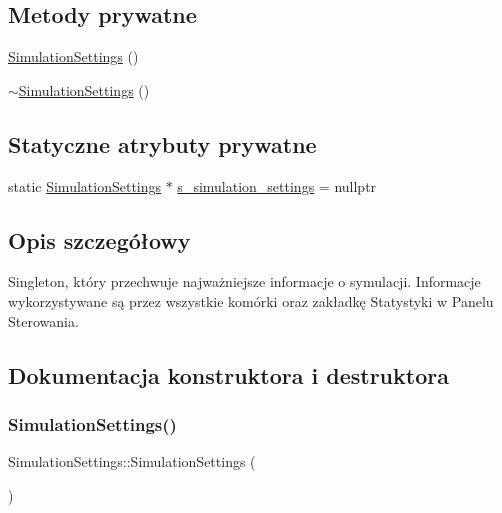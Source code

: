 \subsection*{Metody prywatne}
\begin{DoxyCompactItemize}
\item 
\mbox{\hyperlink{class_simulation_settings_a2fafe4514597b881fbec0caced94c0e5}{Simulation\+Settings}} ()
\item 
\mbox{\hyperlink{class_simulation_settings_a7f09bfc79639238aa08fee0f6f2d0548}{$\sim$\+Simulation\+Settings}} ()
\end{DoxyCompactItemize}
\subsection*{Statyczne atrybuty prywatne}
\begin{DoxyCompactItemize}
\item 
static \mbox{\hyperlink{class_simulation_settings}{Simulation\+Settings}} $\ast$ \mbox{\hyperlink{class_simulation_settings_a725fb3d79c85db8cd446425fac82b50a}{s\+\_\+simulation\+\_\+settings}} = nullptr
\end{DoxyCompactItemize}


\subsection{Opis szczegółowy}
Singleton, który przechwuje najważniejsze informacje o symulacji. Informacje wykorzystywane są przez wszystkie komórki oraz zakładkę Statystyki w Panelu Sterowania. 

\subsection{Dokumentacja konstruktora i destruktora}
\mbox{\label{class_simulation_settings_a2fafe4514597b881fbec0caced94c0e5}} 
\subsubsection{\texorpdfstring{Simulation\+Settings()}{SimulationSettings()}}
{\footnotesize\ttfamily Simulation\+Settings\+::\+Simulation\+Settings (\begin{DoxyParamCaption}{ }\end{DoxyParamCaption})\hspace{0.3cm}{\ttfamily [private]}}

